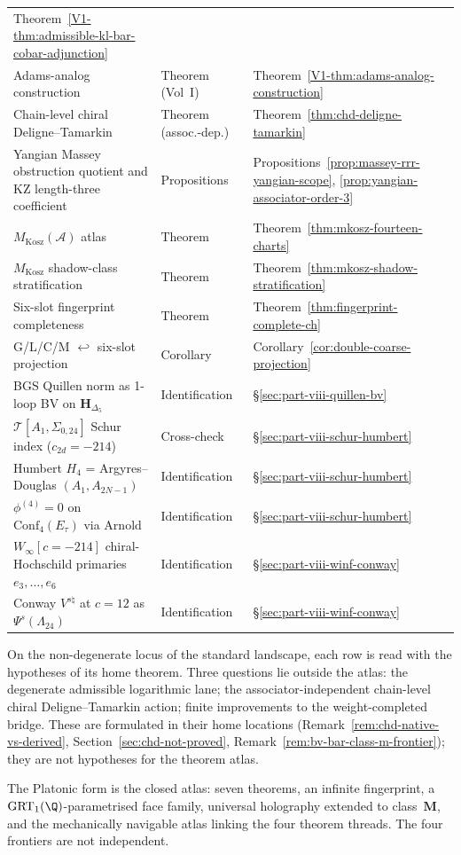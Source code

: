 \begin{center}
\begin{tabular}{@{}p{}p{}p{}@{}}
 Theorem~\ref*{V1-thm:admissible-kl-bar-cobar-adjunction} \\
Adams-analog construction & Theorem (Vol~I) &
 Theorem~\ref*{V1-thm:adams-analog-construction} \\
Chain-level chiral Deligne--Tamarkin & Theorem (assoc.-dep.) &
 Theorem~\ref{thm:chd-deligne-tamarkin} \\
Yangian Massey obstruction quotient and KZ length-three coefficient &
 Propositions &
 Propositions~\ref{prop:massey-rrr-yangian-scope},
 \ref{prop:yangian-associator-order-3} \\
$M_{\mathrm{Kosz}}(\mathcal{A})$ atlas & Theorem &
 Theorem~\ref{thm:mkosz-fourteen-charts} \\
$M_{\mathrm{Kosz}}$ shadow-class stratification & Theorem &
 Theorem~\ref{thm:mkosz-shadow-stratification} \\
Six-slot fingerprint completeness & Theorem &
 Theorem~\ref{thm:fingerprint-complete-ch} \\
G/L/C/M $\hookleftarrow$ six-slot projection & Corollary &
 Corollary~\ref{cor:double-coarse-projection} \\
BGS Quillen norm as 1-loop BV on $\mathbf{H}_{\Delta_5}$ &
 Identification &
 \S\ref{sec:part-viii-quillen-bv} \\
$\mathcal{T}[A_1,\Sigma_{0,24}]$ Schur index ($c_{2d} = -214$) &
 Cross-check &
 \S\ref{sec:part-viii-schur-humbert} \\
Humbert $H_4$ = Argyres--Douglas $(A_1, A_{2N-1})$ &
 Identification &
 \S\ref{sec:part-viii-schur-humbert} \\
$\phi^{(4)} = 0$ on $\mathrm{Conf}_4(E_\tau)$ via Arnold &
 Identification &
 \S\ref{sec:part-viii-schur-humbert} \\
$W_\infty[c=-214]$ chiral-Hochschild primaries $e_3,\ldots,e_6$ &
 Identification &
 \S\ref{sec:part-viii-winf-conway} \\
Conway $V^{s\natural}$ at $c = 12$ as $\Psi^s(\Lambda_{24})$ &
 Identification &
 \S\ref{sec:part-viii-winf-conway} \\
\bottomrule
\end{tabular}
\end{center}

On the non-degenerate locus of the standard landscape, each row is
read with the hypotheses of its home theorem. Three questions lie
outside the atlas: the degenerate admissible logarithmic lane; the
associator-independent chain-level chiral Deligne--Tamarkin action;
finite improvements to the weight-completed bridge. These are
formulated in their home locations
(Remark~\ref{rem:chd-native-vs-derived},
Section~\ref{sec:chd-not-proved},
Remark~\ref{rem:bv-bar-class-m-frontier}); they are not hypotheses for
the theorem atlas.

The Platonic form is the closed atlas: seven theorems, an infinite
fingerprint, a $\mathrm{GRT}_{1}(\Q)$-parametrised face family,
universal holography extended to class~$\mathbf{M}$, and the
mechanically navigable atlas linking the four theorem threads. The
four frontiers are not independent.

